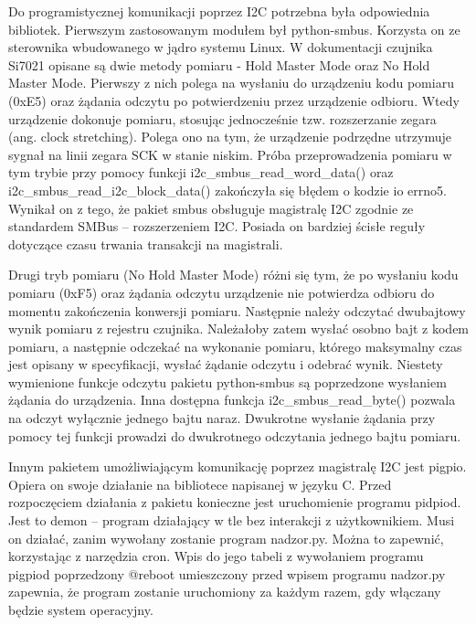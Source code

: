 \documentclass[a4paper,12pt,twoside]{article}
\begin{document}
Do programistycznej komunikacji poprzez I2C potrzebna była odpowiednia bibliotek. Pierwszym zastosowanym modułem był python-smbus. Korzysta on ze sterownika wbudowanego w jądro systemu Linux. W dokumentacji czujnika Si7021 opisane są dwie metody pomiaru - Hold Master Mode oraz No Hold Master Mode. Pierwszy z nich polega na wysłaniu do urządzeniu kodu pomiaru (0xE5) oraz żądania odczytu po potwierdzeniu przez urządzenie odbioru. Wtedy urządzenie dokonuje pomiaru, stosując jednocześnie tzw. rozszerzanie zegara (ang. clock stretching). Polega ono na tym, że urządzenie podrzędne utrzymuje sygnał na linii zegara SCK w stanie niskim. Próba przeprowadzenia pomiaru w tym trybie przy pomocy funkcji i2c{\_}smbus{\_}read{\_}word{\_}data() oraz i2c{\_}smbus{\_}read{\_}i2c{\_}block{\_}data() zakończyła się błędem o kodzie io errno5. Wynikał on z tego, że pakiet smbus obsługuje magistralę I2C zgodnie ze standardem SMBus -- rozszerzeniem I2C. Posiada on bardziej ścisłe reguły dotyczące czasu trwania transakcji na magistrali. 

Drugi tryb pomiaru (No Hold Master Mode) różni się tym, że po wysłaniu kodu pomiaru (0xF5) oraz żądania odczytu urządzenie nie potwierdza odbioru do momentu zakończenia konwersji pomiaru. Następnie należy odczytać dwubajtowy wynik pomiaru z rejestru czujnika. Należałoby zatem wysłać osobno bajt z kodem pomiaru, a następnie odczekać na wykonanie pomiaru, którego maksymalny czas jest opisany w specyfikacji, wysłać żądanie odczytu i odebrać wynik. Niestety wymienione funkcje odczytu pakietu python-smbus są poprzedzone wysłaniem żądania do urządzenia. Inna dostępna funkcja i2c{\_}smbus{\_}read{\_}byte() pozwala na odczyt wyłącznie jednego bajtu naraz. Dwukrotne wysłanie żądania przy pomocy tej funkcji prowadzi do dwukrotnego odczytania jednego bajtu pomiaru.

Innym pakietem umożliwiającym komunikację poprzez magistralę I2C jest pigpio. Opiera on swoje działanie na bibliotece napisanej w języku C. Przed rozpoczęciem działania z pakietu konieczne jest uruchomienie programu pidpiod. Jest to demon -- program działający w tle bez interakcji z użytkownikiem. Musi on działać, zanim wywołany zostanie program nadzor.py. Można to zapewnić, korzystając z narzędzia cron. Wpis do jego tabeli z wywołaniem programu pigpiod poprzedzony @reboot umieszczony przed wpisem programu nadzor.py zapewnia, że program zostanie uruchomiony za każdym razem, gdy włączany będzie system operacyjny.
\end{document}
